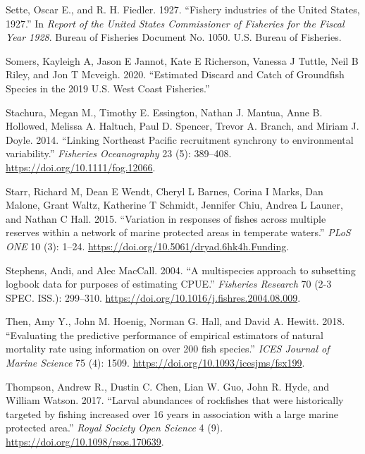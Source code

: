 \documentclass[
  english,
  a4paper,
]{article}
\newlength{\cslhangindent}
\newlength{\cslentryspacingunit} %
\newenvironment{CSLReferences}[2] %
 {%
  \setlength{\parindent}{0pt}
  \ifodd #1
  \let\oldpar\par
  \def\par{\hangindent=\cslhangindent\oldpar}
  \fi
  \setlength{\parskip}{#2\cslentryspacingunit}
 }%
 {}
\begin{document}
\begin{CSLReferences}{1}{0}
\leavevmode{}%
Sette, Oscar E., and R. H. Fiedler. 1927. {``{Fishery industries of the United States, 1927}.''} In \emph{Report of the United States Commissioner of Fisheries for the Fiscal Year 1928}. Bureau of Fisheries Document No. 1050. U.S. Bureau of Fisheries.

\leavevmode{}%
Somers, Kayleigh A, Jason E Jannot, Kate E Richerson, Vanessa J Tuttle, Neil B Riley, and Jon T Mcveigh. 2020. {``{Estimated Discard and Catch of Groundfish Species in the 2019 U.S. West Coast Fisheries}.''}

\leavevmode{}%
Stachura, Megan M., Timothy E. Essington, Nathan J. Mantua, Anne B. Hollowed, Melissa A. Haltuch, Paul D. Spencer, Trevor A. Branch, and Miriam J. Doyle. 2014. {``{Linking Northeast Pacific recruitment synchrony to environmental variability}.''} \emph{Fisheries Oceanography} 23 (5): 389--408. \url{https://doi.org/10.1111/fog.12066}.

\leavevmode{}%
Starr, Richard M, Dean E Wendt, Cheryl L Barnes, Corina I Marks, Dan Malone, Grant Waltz, Katherine T Schmidt, Jennifer Chiu, Andrea L Launer, and Nathan C Hall. 2015. {``{Variation in responses of fishes across multiple reserves within a network of marine protected areas in temperate waters}.''} \emph{PLoS ONE} 10 (3): 1--24. \url{https://doi.org/10.5061/dryad.6hk4h.Funding}.

\leavevmode{}%
Stephens, Andi, and Alec MacCall. 2004. {``{A multispecies approach to subsetting logbook data for purposes of estimating CPUE}.''} \emph{Fisheries Research} 70 (2-3 SPEC. ISS.): 299--310. \url{https://doi.org/10.1016/j.fishres.2004.08.009}.

\leavevmode{}%
Then, Amy Y., John M. Hoenig, Norman G. Hall, and David A. Hewitt. 2018. {``{Evaluating the predictive performance of empirical estimators of natural mortality rate using information on over 200 fish species}.''} \emph{ICES Journal of Marine Science} 75 (4): 1509. \url{https://doi.org/10.1093/icesjms/fsx199}.

\leavevmode{}%
Thompson, Andrew R., Dustin C. Chen, Lian W. Guo, John R. Hyde, and William Watson. 2017. {``{Larval abundances of rockfishes that were historically targeted by fishing increased over 16 years in association with a large marine protected area}.''} \emph{Royal Society Open Science} 4 (9). \url{https://doi.org/10.1098/rsos.170639}.


\end{CSLReferences}
\end{document}
